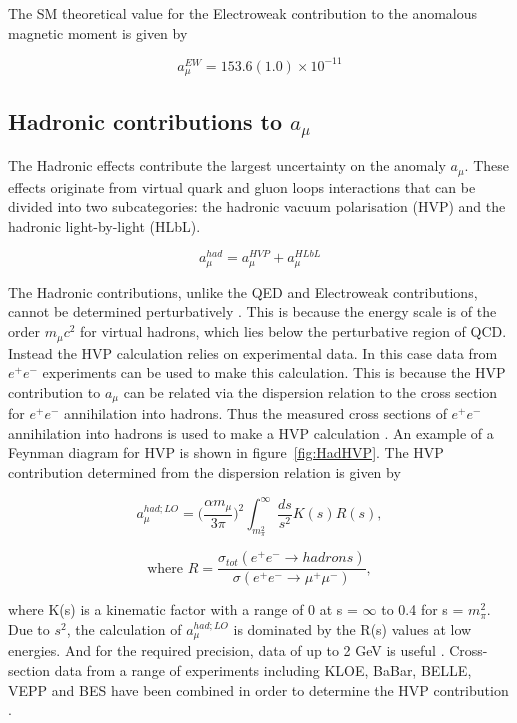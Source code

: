 The SM theoretical value for the Electroweak contribution to the anomalous magnetic moment is given by

\begin{equation}
a_{\mu}^{EW} = 153.6(1.0){\times}10^{-11}
\end{equation}

\subsection{Hadronic contributions to $a_{\mu}$}

The Hadronic effects contribute the largest uncertainty on the anomaly $a_{\mu}$. These effects originate from virtual quark and gluon loops interactions that can be divided into two subcategories: the hadronic vacuum polarisation (HVP) and the hadronic light-by-light (HLbL).

\begin{equation}
a_{\mu}^{had} = a_{\mu}^{HVP} + a_{\mu}^{HLbL}
\end{equation}

The Hadronic contributions, unlike the QED and Electroweak contributions, cannot be determined perturbatively \cite{Reference20}. This is because the energy scale is of the order $m_{\mu}c^2$ for virtual hadrons, which lies below the perturbative region of QCD. Instead the HVP calculation relies on experimental data. In this case data from ${e^+}{e^-}$ experiments can be used to make this calculation. This is because the HVP contribution to $a_{\mu}$ can be related via the dispersion relation to the cross section for ${e^+}{e^-}$ annihilation into hadrons. Thus the measured cross sections of ${e^+}{e^-}$ annihilation into hadrons is used to make a HVP calculation \cite{Reference21}. An example of a Feynman diagram for HVP is shown in figure~\ref{fig:HadHVP}. The HVP contribution determined from the dispersion relation is given by

\begin{equation}
a_{\mu}^{had;LO} = \Big(\frac{\alpha{m}_{\mu}}{3\pi}\Big)^{2}\int^{\infty}_{m^{2}_{\pi}} \frac{ds}{s^2}K(s)R(s), 
\end{equation}

\begin{equation}
\text{where } R = \frac{\sigma_{tot}(e^{+}e^{-} \rightarrow hadrons)}{\sigma(e^{+}e^{-} \rightarrow \mu^{+}\mu^{-})},
\end{equation}

where K(s) is a kinematic factor with a range of 0 at s = $\infty$ to 0.4 for s = $m^{2}_{\pi}$. Due to $s^2$, the calculation of $a_{\mu}^{had;LO}$ is dominated by the R(s) values at low energies. And for the required precision, data of up to 2 GeV is useful \cite{Reference29}. Cross-section data from a range of experiments including KLOE, BaBar, BELLE, VEPP and BES have been combined in order to determine the HVP contribution \cite{Reference22}.

